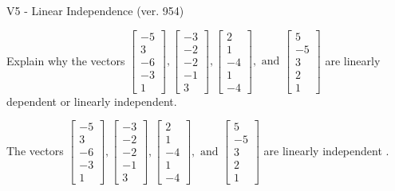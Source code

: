 \begin{exercise}
  \begin{exerciseTitle}V5 - Linear Independence (ver. 954)\end{exerciseTitle}
  \begin{exerciseStatement}
    Explain why the vectors \(\left[\begin{array}{r}
-5 \\
3 \\
-6 \\
-3 \\
1
\end{array}\right] , \left[\begin{array}{r}
-3 \\
-2 \\
-2 \\
-1 \\
3
\end{array}\right] , \left[\begin{array}{r}
2 \\
1 \\
-4 \\
1 \\
-4
\end{array}\right] , \text{ and } \left[\begin{array}{r}
5 \\
-5 \\
3 \\
2 \\
1
\end{array}\right]\) are linearly dependent or linearly independent.	


  \end{exerciseStatement}
  \begin{exerciseAnswer}
   The vectors \(\left[\begin{array}{r}
-5 \\
3 \\
-6 \\
-3 \\
1
\end{array}\right] , \left[\begin{array}{r}
-3 \\
-2 \\
-2 \\
-1 \\
3
\end{array}\right] , \left[\begin{array}{r}
2 \\
1 \\
-4 \\
1 \\
-4
\end{array}\right] , \text{ and } \left[\begin{array}{r}
5 \\
-5 \\
3 \\
2 \\
1
\end{array}\right]\) are 
  	 linearly independent  .
  


  \end{exerciseAnswer}
\end{exercise}